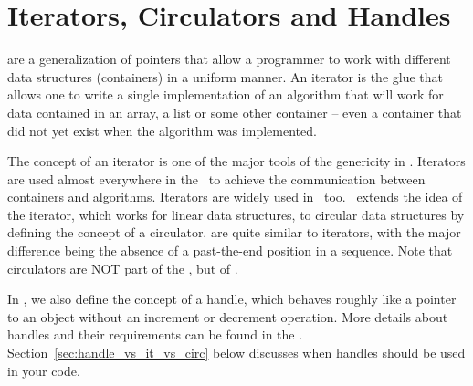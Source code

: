 
\chapter{Iterators, Circulators and Handles \label{chap:iterators_and_circulators}}
\ccIndexMainItemBegin{\stl} 


are a generalization of pointers that allow a programmer to work 
with different data structures (containers) in a uniform manner. 
An iterator is the glue that allows one to write a single implementation of 
an algorithm that will work for data contained in an array, a list or some 
other container -- even a container that did not yet exist when the algorithm 
was implemented. 

The concept of an iterator is one of the major tools of the genericity
in \stl.
Iterators are used almost everywhere in the \stl\  to
achieve the communication between containers and algorithms.
Iterators are widely used in \cgal\ too.
\cgal\ extends the idea of the iterator, which works for linear data
structures, to circular data structures by defining the concept of
a circulator.  
are quite similar to iterators, with the
major difference being the absence of a past-the-end position in a sequence.
Note that circulators are NOT part of the \stl, but of \cgal.

In \cgal, we also define the concept of a handle, 
which behaves roughly
like a pointer to an object without an increment or decrement operation.
More details about handles and their requirements can be found in 
the . 
Section~\ref{sec:handle_vs_it_vs_circ} below discusses when handles
should be used in your code.

